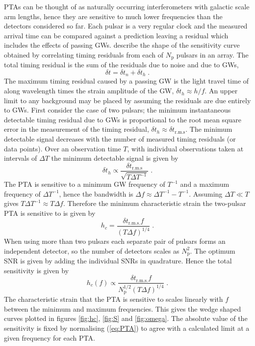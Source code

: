 PTAs can be thought of as naturally occurring interferometers with galactic scale arm lengths, hence they are sensitive to much lower frequencies than the detectors considered so far. Each pulsar is a very regular clock and the measured arrival time can be compared against a prediction leaving a residual which includes the effects of passing GWs. \cite{SesanaVecchioColancino} describe the shape of the sensitivity curve obtained by correlating timing residuals from each of $N_{\textrm{p}}$ pulsars in an array. The total timing residual is the sum of the residuals due to noise and due to GWs,
\begin{equation} \delta t= \delta t_{n} + \delta t _{h} \; .\end{equation}
The maximum timing residual caused by a passing GW is the light travel time of along wavelength times the strain amplitude of the GW, $\delta t_{h}\approx h/f$. An upper limit to any background may be placed by assuming the residuals are due entirely to GWs. First consider the case of two pulsars; the minimum instantaneous detectable timing residual due to GWs is proportional to the root mean square error in the measurement of the timing residual, $\delta t_{h}\approx\delta t_{\textrm{r.m.s}}$. The minimum detectable signal decreases with the number of measured timing residuals (or data points). Over an observation time $T$, with individual observations taken at intervals of $\Delta T$ the minimum detectable signal is given by
\begin{equation}\label{eq:GWtimingresidual} \delta t_{h} \propto \frac{\delta t_{\textrm{r.m.s}}}{\sqrt{T\Delta T ^{-1}}} \; . \end{equation}
The PTA is sensitive to a minimum GW frequency of $T^{-1}$ and a maximum frequency of $\Delta T^{-1}$, hence the bandwidth is $\Delta f \approx \Delta T^{-1}-T^{-1}$. Assuming $\Delta T \ll T$ gives $T\Delta T^{-1} \approx T \Delta f$. Therefore the minimum characteristic strain the two-pulsar PTA is sensitive to is given by
\begin{equation} h_{c}=\frac{\delta t_{\textrm{r.m.s.}}f}{\left(T\Delta f\right)^{1/4}} \; . \end{equation}
When using more than two pulsars each separate pair of pulsars forms an independent detector, so the number of detectors scales as $N_{\textrm{p}}^{2}$. The optimum SNR is given by adding the individual SNRs in quadrature. Hence the total sensitivity is given by
\begin{equation}\label{eq:PTA} h_{c}(f) \propto \frac{\delta t_{\textrm{r.m.s.}}f}{N_{\textrm{p}}^{1/2}\left( T\Delta f \right)^{1/4}} \; . \end{equation}
The characteristic strain that the PTA is sensitive to scales linearly with $f$ between the minimum and maximum frequencies. This gives the wedge shaped curves plotted in figures \ref{fig:hc}, \ref{fig:S} and \ref{fig:omega}. The absolute value of the sensitivity is fixed by normalising (\ref{eq:PTA}) to agree with a calculated limit at a given frequency for each PTA.

